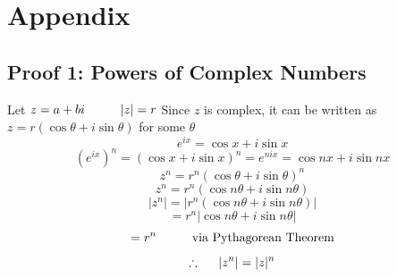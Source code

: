 \documentclass[12pt]{article}
\begin{document}
\section*{Appendix}
\subsection*{Proof 1: Powers of Complex Numbers}
\begin{center}
	Let $z= a + bi\hspace{10mm}|z|=r$\linebreak
	Since $z$ is complex, it can be written as $z=r(\cos\theta+i\sin\theta)$ for some $\theta$
	$$e^{ix} = \cos x+i\sin x$$
	$$(e^{ix})^n = (\cos x+i\sin x)^n = e^{nix} = \cos nx+i\sin nx$$
	$$z^n=r^n(\cos\theta+i\sin\theta)^n$$
	$$z^n=r^n(\cos n\theta+i\sin n\theta)$$
	$$|z^n|=|r^n(\cos n\theta+i\sin n\theta)|$$
	$$ = r^n|\cos n\theta+i\sin n\theta|$$
	$$ = r^n\hspace{10mm}\text{via Pythagorean Theorem}$$
	$$\huge\therefore\normalsize\hspace{5mm}|z^n|=|z|^n$$
\end{center}
\end{document}
